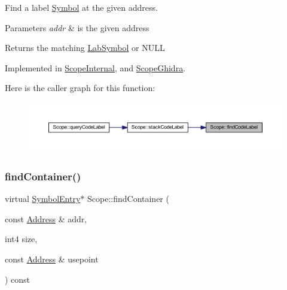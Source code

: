 Find a label \mbox{\hyperlink{class_symbol}{Symbol}} at the given address. 


\begin{DoxyParams}{Parameters}
{\em addr} & is the given address \\
\hline
\end{DoxyParams}
\begin{DoxyReturn}{Returns}
the matching \mbox{\hyperlink{class_lab_symbol}{Lab\+Symbol}} or N\+U\+LL 
\end{DoxyReturn}


Implemented in \mbox{\hyperlink{class_scope_internal_a602029280a3bc0dac8aac016ec934d5b}{Scope\+Internal}}, and \mbox{\hyperlink{class_scope_ghidra_a81328af0bc4954612d1e107e592a246a}{Scope\+Ghidra}}.

Here is the caller graph for this function\+:
\nopagebreak
\begin{figure}[H]
\begin{center}
\leavevmode
\includegraphics[width=350pt]{class_scope_af4bac52b9d64974b87432c0379cc38c6_icgraph}
\end{center}
\end{figure}
\mbox{\label{class_scope_a609fc1ef47d047717da65827e025cfdd}} 
\subsubsection{\texorpdfstring{findContainer()}{findContainer()}}
{\footnotesize\ttfamily virtual \mbox{\hyperlink{class_symbol_entry}{Symbol\+Entry}}$\ast$ Scope\+::find\+Container (\begin{DoxyParamCaption}\item[{const \mbox{\hyperlink{class_address}{Address}} \&}]{addr,  }\item[{int4}]{size,  }\item[{const \mbox{\hyperlink{class_address}{Address}} \&}]{usepoint }\end{DoxyParamCaption}) const\hspace{0.3cm}{\ttfamily [pure virtual]}}



